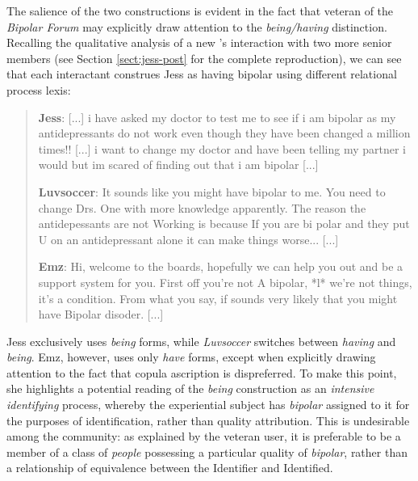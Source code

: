 The salience of the two constructions is evident in the fact that veteran  of the \emph{Bipolar Forum} may explicitly draw attention to the \emph{being\slash having} distinction. Recalling the qualitative analysis of a new 's interaction with two more senior \glspl{member} (see Section \ref{sect:jess-post} for the complete reproduction), we can see that each interactant construes Jess as having \gls{bipolar} using different relational process lexis:

\begin{quotation}\small\singlespacing

\noindent \textbf{Jess}: [...] i have asked my doctor to test me to see if i am bipolar as my antidepressants do not work even though they have been changed a million times!! [...] i want to change my doctor and have been telling my partner i would but im scared of finding out that i am bipolar [...]

\noindent \textbf{Luvsoccer}: It sounds like you might have bipolar to me. You need to change Drs. One with more knowledge apparently. The reason the antidepessants are not Working is because If you are bi polar and they put U on an antidepressant alone it can make things worse... [...]

\noindent \textbf{Emz}: Hi, welcome to the boards, hopefully we can help you out and be a support system for you. First off you're not A bipolar, *l* we're not things, it's a condition. From what you say, if sounds very likely that you might have Bipolar disoder. [...]

\end{quotation}
%
Jess exclusively uses \emph{being} forms, while \emph{Luvsoccer} switches between \emph{having} and \emph{being}. Emz, however, uses only \emph{have} forms, except when explicitly drawing attention to the fact that copula ascription is dispreferred. To make this point, she highlights a potential reading of the \emph{being} construction as an \emph{intensive identifying} process, whereby the experiential subject has \emph{bipolar} assigned to it for the purposes of identification, rather than quality attribution. This is undesirable among the community: as explained by the veteran user, it is preferable to be a member of a class of \emph{people} possessing a particular quality of \emph{bipolar}, rather than a relationship of equivalence between the Identifier and Identified.

